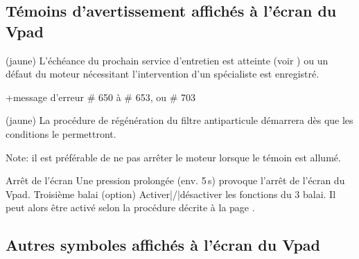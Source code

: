 \setupparagraphs [SymVpad][1][width=4em,inner=\hfill]


\subsection{Témoins d'avertissement affichés à l’écran du Vpad} %


\startSymVpad
\externalfigure[vpadWarningService][height=1.7\lH]
\SymVpad
{} (jaune) L’échéance du prochain service d’entretien est atteinte
(voir  )
ou un défaut du moteur nécessitant l'intervention d'un spécialiste est enregistré.


+\:message d’erreur \# 650 à \# 653, ou \# 703
\stopSymVpad


\startSymVpad
\externalfigure[vpadTDPF][height=1.7\lH]
\SymVpad
{} (jaune) La procédure de régénération du filtre antiparticule démarrera
dès que les conditions le permettront.

{\md Note:} {\lt il est préférable de ne pas arrêter le moteur lorsque le témoin est allumé.}
\stopSymVpad





\bTR\bTD {} \eTD\bTD Arrêt de l'écran \eTD\bTD Une pression prolongée (env. 5\,s) provoque l'arrêt de l'écran du Vpad. \eTD\eTR
\eTD\bTD Troisième balai (option) \eTD\bTD Activer|/|désactiver les fonctions du 3 balai.
Il peut alors être activé selon la procédure décrite à la page . \eTD\eTR



\startsection [title={Description des menus du Vpad}]



\subsection{Autres symboles affichés à l’écran du Vpad}





